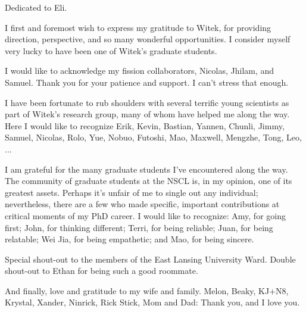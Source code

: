 \documentclass{msuphddissertation}
\begin{document}
\begin{dedication} 
Dedicated to Eli.
\end{dedication}

\begin{acknowledgment}
I first and foremost wish to express my gratitude to Witek, for providing direction, perspective, and so many wonderful opportunities. I consider myself very lucky to have been one of Witek's graduate students.

I would like to acknowledge my fission collaborators, Nicolas, Jhilam, and Samuel. Thank you for your patience and support. I can't stress that enough.

I have been fortunate to rub shoulders with several terrific young scientists as part of Witek's research group, many of whom have helped me along the way. Here I would like to recognize Erik, Kevin, Bastian, Yannen, Chunli, Jimmy, Samuel, Nicolas, Rolo, Yue, Nobuo, Futoshi, Mao, Maxwell, Mengzhe, Tong, Leo, ...

I am grateful for the many graduate students I've encountered along the way. The community of graduate students at the NSCL is, in my opinion, one of its greatest assets. Perhaps it's unfair of me to single out any individual; nevertheless, there are a few who made specific, important contributions at critical moments of my PhD career. I would like to recognize: 
Amy, for going first;
John, for thinking different;
Terri, for being reliable;
Juan, for being relatable;
Wei Jia, for being empathetic;
and Mao, for being sincere.

Special shout-out to the members of the East Lansing University Ward. Double shout-out to Ethan for being such a good roommate.

And finally, love and gratitude to my wife and family. Melon, Beaky, KJ+N8, Krystal, Xander, Ninrick, Rick Stick, Mom and Dad: Thank you, and I love you.
\end{acknowledgment}

\end{document}
